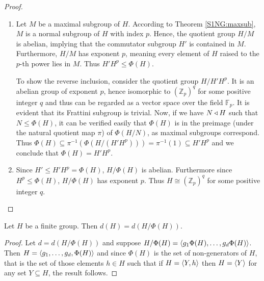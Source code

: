 \begin{proof}
    \begin{enumerate}
        \item Let $M$ be a maximal subgroup of $H$. According to Theorem \ref{S1NG:maxsub}, $M$ is a normal subgroup of $H$ with index $p$. 
        Hence, the quotient group $H/M$ is abelian, implying that the commutator subgroup $H'$ is contained in $M$. 
        Furthermore, $H/M$ has exponent $p$, meaning every element of $H$ raised to the $p$-th power lies in $M$. 
        Thus $H'H^p \le \Phi(H)$.

        To show the reverse inclusion, consider the quotient group $H/H'H^p$.
        It is an abelian group of exponent $p$, hence isomorphic to $(\mathbb{Z}_p)^q$ for some positive integer $q$ and thus can be regarded as a vector space over the field $\mathbb{F}_p$.
        It is evident that its Frattini subgroup is trivial.
        Now, if we have $N \triangleleft H$ such that $N \le \Phi(H)$, it can be verified easily that $\Phi(H)$ is in the preimage (under the natural quotient map $\pi$) of $\Phi(H/N)$, as maximal subgroups correspond.
        Thus $\Phi(H) \subseteq \pi^{-1}(\Phi(H/(H'H^p))) = \pi^{-1}(1) \subseteq H'H^p$ and we conclude that $\Phi(H) = H'H^p$.

        \item Since $H' \le H'H^p = \Phi(H)$, $H/\Phi(H)$ is abelian. Furthermore since $H^p \le \Phi(H)$, $H/\Phi(H)$ has exponent $p$.
        Thus $H \cong (\mathbb{Z}_p)^q$ for some positive integer $q$.

    \end{enumerate}
\end{proof}

\begin{theorem}
\label{th:fratgen}
Let $H$ be a finite group. Then $d(H) = d(H/\Phi(H))$.
\end{theorem}
\begin{proof}
    Let $d = d(H/\Phi(H))$ and suppose $H/\Phi(H) = \langle g_1\Phi(H),\ldots ,g_d\Phi(H) \rangle$. 
    Then $H = \langle g_1,\ldots ,g_d,\Phi(H) \rangle$ and since $\Phi(H)$ is the set of non-generators of $H$, that is the set of those elements $h \in H$ such that if $H = \langle Y, h \rangle$ then $H = \langle Y \rangle$ for any set $Y \subseteq H$, the result follows.
\end{proof}
